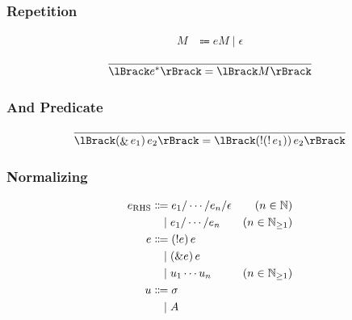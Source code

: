 \subsubsection{Repetition}

\begin{align*}
  M &\Coloneqq e M \mid \epsilon
\end{align*}

\begin{gather*}
  \infer{\semanticf{e^*} = \semanticf{M}}{}
\end{gather*}

\subsubsection{And Predicate}

\begin{gather*}
  \infer{\semanticf{(\mathop{\&} e_1)\, e_2} = \semanticf{(\mathop{!} (\mathop{!} e_1))\, e_2}}{}
\end{gather*}

\subsubsection{Normalizing}

\begin{align*}
  e_{\mathrm{RHS}}
  &\Coloneqq e_1 / \cdots / e_n / \epsilon &(n \in \Natural) \\
  &\BNFor e_1 / \cdots / e_n &(n \in \Natural_{\geq 1}) \\
  e
  &\Coloneqq (! e)\, e \\
  &\BNFor (\& e)\, e \\
  &\BNFor u_1 \cdots u_n &(n \in \Natural_{\geq 1}) \\
  u
  &\Coloneqq \sigma \\
  &\BNFor A
\end{align*}
